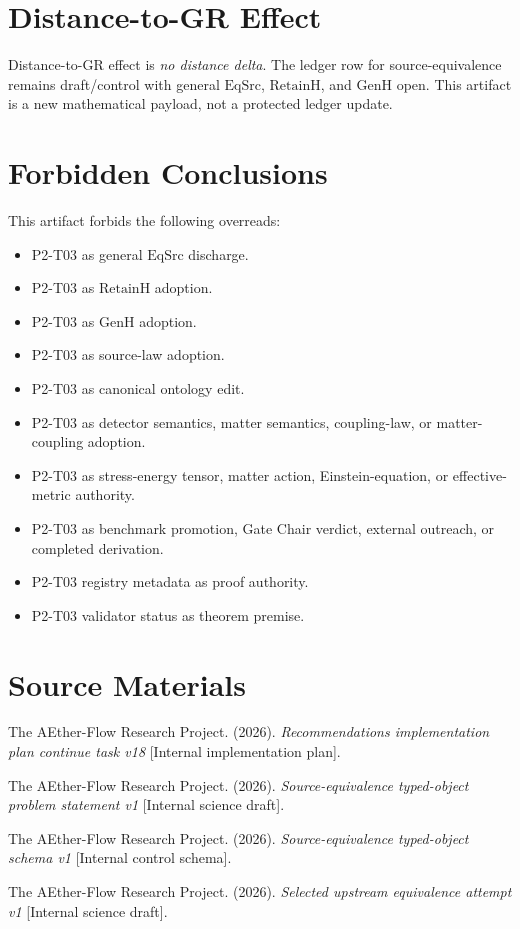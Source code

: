 \documentclass[11pt]{article}
\newcommand{\EqSrc}{\mathrm{EqSrc}}
\newcommand{\RetainH}{\mathrm{RetainH}}
\newcommand{\GenH}{\mathrm{GenH}}
\begin{document}
\section{Distance-to-GR Effect}

Distance-to-GR effect is \emph{no distance delta}. The ledger row for
source-equivalence remains draft/control with general \(\EqSrc\), \(\RetainH\),
and \(\GenH\) open. This artifact is a new mathematical payload, not a
protected ledger update.

\section{Forbidden Conclusions}

This artifact forbids the following overreads:
\begin{itemize}
\item P2-T03 as general \(\EqSrc\) discharge.
\item P2-T03 as \(\RetainH\) adoption.
\item P2-T03 as \(\GenH\) adoption.
\item P2-T03 as source-law adoption.
\item P2-T03 as canonical ontology edit.
\item P2-T03 as detector semantics, matter semantics, coupling-law, or
matter-coupling adoption.
\item P2-T03 as stress-energy tensor, matter action, Einstein-equation, or
effective-metric authority.
\item P2-T03 as benchmark promotion, Gate Chair verdict, external outreach, or
completed derivation.
\item P2-T03 registry metadata as proof authority.
\item P2-T03 validator status as theorem premise.
\end{itemize}

\section{Source Materials}

The AEther-Flow Research Project. (2026). \emph{Recommendations implementation
plan continue task v18} [Internal implementation plan].

The AEther-Flow Research Project. (2026). \emph{Source-equivalence typed-object
problem statement v1} [Internal science draft].

The AEther-Flow Research Project. (2026). \emph{Source-equivalence typed-object
schema v1} [Internal control schema].

The AEther-Flow Research Project. (2026). \emph{Selected upstream equivalence
attempt v1} [Internal science draft].
\end{document}
